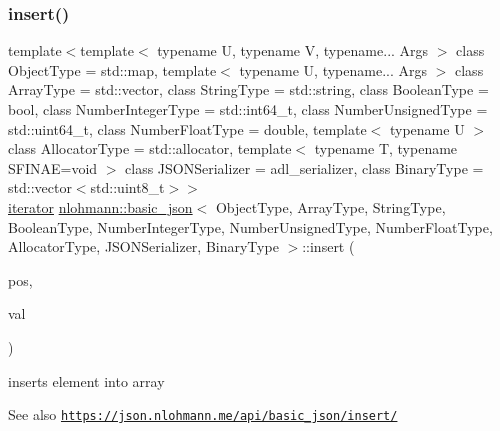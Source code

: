 \subsubsection{\texorpdfstring{insert()}{insert()}\hspace{0.1cm}{\footnotesize\ttfamily [2/6]}}
{\footnotesize\ttfamily template$<$template$<$ typename U, typename V, typename... Args $>$ class Object\+Type = std\+::map, template$<$ typename U, typename... Args $>$ class Array\+Type = std\+::vector, class String\+Type  = std\+::string, class Boolean\+Type  = bool, class Number\+Integer\+Type  = std\+::int64\+\_\+t, class Number\+Unsigned\+Type  = std\+::uint64\+\_\+t, class Number\+Float\+Type  = double, template$<$ typename U $>$ class Allocator\+Type = std\+::allocator, template$<$ typename T, typename S\+F\+I\+N\+A\+E=void $>$ class J\+S\+O\+N\+Serializer = adl\+\_\+serializer, class Binary\+Type  = std\+::vector$<$std\+::uint8\+\_\+t$>$$>$ \\
\hyperlink{classnlohmann_1_1basic__json_aa549b2b382916b3baafb526e5cb410bd}{iterator} \hyperlink{classnlohmann_1_1basic__json}{nlohmann\+::basic\+\_\+json}$<$ Object\+Type, Array\+Type, String\+Type, Boolean\+Type, Number\+Integer\+Type, Number\+Unsigned\+Type, Number\+Float\+Type, Allocator\+Type, J\+S\+O\+N\+Serializer, Binary\+Type $>$\+::insert (\begin{DoxyParamCaption}\item[{\hyperlink{classnlohmann_1_1basic__json_aebd2cfa7e4ded4e97cde9269bfeeea38}{const\+\_\+iterator}}]{pos,  }\item[{\hyperlink{classnlohmann_1_1basic__json}{basic\+\_\+json}$<$ Object\+Type, Array\+Type, String\+Type, Boolean\+Type, Number\+Integer\+Type, Number\+Unsigned\+Type, Number\+Float\+Type, Allocator\+Type, J\+S\+O\+N\+Serializer, Binary\+Type $>$ \&\&}]{val }\end{DoxyParamCaption})\hspace{0.3cm}{\ttfamily [inline]}}



inserts element into array 

\begin{DoxySeeAlso}{See also}
\href{https://json.nlohmann.me/api/basic_json/insert/}{\tt https\+://json.\+nlohmann.\+me/api/basic\+\_\+json/insert/} 
\end{DoxySeeAlso}
\mbox{\label{classnlohmann_1_1basic__json_a71e197e6cc78c3960011f68a75f8ef22}} 
